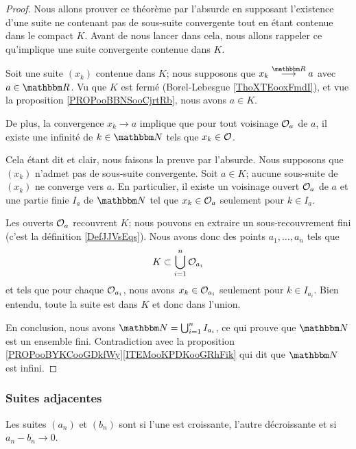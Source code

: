 \begin{proof}
    Nous allons prouver ce théorème par l'absurde en supposant l'existence d'une suite ne contenant pas de sous-suite convergente tout en étant contenue dans le compact \( K\). Avant de nous lancer dans cela, nous allons rappeler ce qu'implique une suite convergente contenue dans \( K\).

    Soit une suite \( (x_k)\) contenue dans \( K\); nous supposons que \( x_k\stackrel{\eR}{\longrightarrow} a\) avec \( a\in \eR\). Vu que \( K\) est fermé (Borel-Lebesgue \ref{ThoXTEooxFmdI}), et vue la proposition \ref{PROPooBBNSooCjrtRb}, nous avons \( a\in K\).

    De plus, la convergence \( x_k\to a\) implique que pour tout voisinage \( \mathcal{O}_a\) de \( a\), il existe une infinité de \( k\in \eN\) tels que \( x_k\in\mathcal{O}\).

    Cela étant dit et clair, nous faisons la preuve par l'absurde. Nous supposons que \( (x_k)\) n'admet pas de sous-suite convergente. Soit \( a\in K\); aucune sous-suite de \( (x_k)\) ne converge vers \( a\). En particulier, il existe un voisinage ouvert \( \mathcal{O}_a\) de \( a\) et une partie finie \( I_a\) de \( \eN\) tel que \( x_k\in \mathcal{O}_a\) seulement pour \( k\in I_a\).

    Les ouverts \( \mathcal{O}_a\) recouvrent \( K\); nous pouvons en extraire un sous-recouvrement fini (c'est la définition \ref{DefJJVsEqs}). Nous avons donc des points \( a_1,\ldots, a_n\) tels que 
    \begin{equation}
        K\subset \bigcup_{i=1}^n\mathcal{O}_{a_i}
    \end{equation}
    et tels que pour chaque \( \mathcal{O}_{a_i}\), nous avons \( x_k\in \mathcal{O}_{a_i}\) seulement pour \( k\in I_{a_i}\). Bien entendu, toute la suite est dans \( K\) et donc dans l'union.

    En conclusion, nous avons \( \eN=\bigcup_{i=1}^n I_{a_i}\), ce qui prouve que \( \eN\) est un ensemble fini. Contradiction avec la proposition \ref{PROPooBYKCooGDkfWy}\ref{ITEMooKPDKooGRhFik} qui dit que \( \eN\) est infini.
\end{proof}


\subsubsection{Suites adjacentes}

\begin{definition}       \label{DEFooDMZLooDtNPmu}
    Les suites \( (a_n)\) et \( (b_n)\) sont  si l'une est croissante, l'autre décroissante et si \( a_n-b_n\to 0\).
\end{definition}

